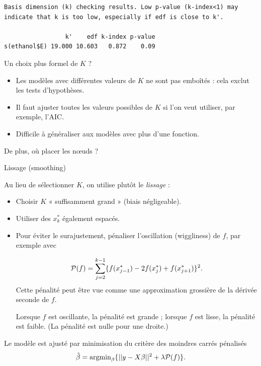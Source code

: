 \documentclass{BeamerTemplate}
\begin{document}
\begin{refsection}
\begin{frame}[fragile]{}
{\begin{verbatim}
Basis dimension (k) checking results. Low p-value (k-index<1) may
indicate that k is too low, especially if edf is close to k'.

                 k'    edf k-index p-value
s(ethanol$E) 19.000 10.603   0.872    0.09
\end{verbatim}
}
\end{frame}

\begin{frame}{Un choix plus formel de $K$ ?}

\begin{itemize}
\item Les modèles avec différentes valeurs de $K$ ne sont pas emboîtés : cela exclut les tests d'hypothèses.
\item Il faut ajuster toutes les valeurs possibles de $K$ si l'on veut utiliser, par exemple, l'AIC.
\item Difficile à généraliser aux modèles avec plus d'une fonction.
\end{itemize}

\bigskip
De plus, où placer les nœuds ?

\end{frame}


\begin{frame}{Lissage (smoothing)}

Au lieu de sélectionner $K$, on utilise plutôt le \textit{lissage} :

\begin{itemize}
\item Choisir $K$ « suffisamment grand » (biais négligeable).
\item Utiliser des $x_k^*$ également espacés.
\item Pour éviter le surajustement, pénaliser l'oscillation (wiggliness) de $f$, par exemple avec 

$${\cal P} (f) = \sum_{j=2}^{k-1} \{f(x_{j-1}^*) - 2 f(x_j^*) + f(x_{j+1}^*) \}^2.$$
Cette pénalité peut être vue comme une approximation grossière de la dérivée seconde de $f$.

\bigskip
Lorsque $f$ est oscillante, la pénalité est grande ; lorsque $f$ est lisse, la pénalité est faible. (La pénalité est nulle pour une droite.)
\end{itemize}
\end{frame}

\begin{frame}{}
Le modèle est ajusté par minimisation du critère des moindres carrés pénalisés
 $$\hat{\beta} = \mbox{argmin}_{\beta} \{  ||y - X \beta ||^2 + \lambda {\cal P}(f) \}.$$


\end{frame}
\end{refsection}
\end{document}
